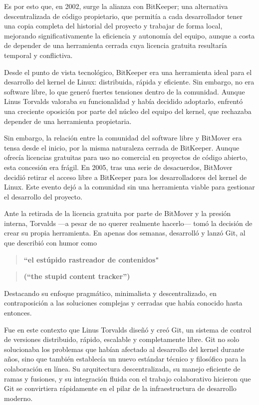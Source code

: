 \documentclass[a4paper,12pt]{article}
\begin{document}
Es por esto que, en 2002, surge la alianza con BitKeeper; una alternativa
descentralizada de código propietario, que permitía a cada desarrollador
tener una copia completa del historial del proyecto y trabajar de forma local,
mejorando significativamente la eficiencia y autonomía del equipo, aunque a
costa de depender de una herramienta cerrada cuya licencia gratuita resultaría
temporal y conflictiva.

Desde el punto de vista tecnológico, BitKeeper era una herramienta ideal para el
desarrollo del kernel de Linux: distribuida, rápida y eficiente. Sin embargo, no
era software libre, lo que generó fuertes tensiones dentro de la comunidad.
Aunque Linus Torvalds valoraba su funcionalidad y había decidido adoptarlo,
enfrentó una creciente oposición por parte del núcleo del equipo del kernel, que
rechazaba depender de una herramienta propietaria.

Sin embargo, la relación entre la comunidad del software libre y BitMover era
tensa desde el inicio, por la misma naturaleza cerrada de BitKeeper. Aunque
ofrecía licencias gratuitas para uso no comercial en proyectos de código
abierto, esta concesión era frágil. En 2005, tras una serie de desacuerdos,
BitMover decidió retirar el acceso libre a BitKeeper para los desarrolladores
del kernel de Linux. Este evento dejó a la comunidad sin una herramienta viable
para gestionar el desarrollo del proyecto.

Ante la retirada de la licencia gratuita por parte de BitMover y la presión
interna, Torvalds —a pesar de no querer realmente hacerlo— tomó la decisión de
crear su propia herramienta. En apenas dos semanas, desarrolló y lanzó Git, al
que describió con humor como 
\begin{quote}
\textbf{``el estúpido rastreador de contenidos"}
\end{quote}
\begin{quote}
\textbf{(“the stupid content tracker”)}
\end{quote}

Destacando su enfoque pragmático, minimalista y
descentralizado, en contraposición a las soluciones complejas y cerradas que
había conocido hasta entonces.

Fue en este contexto que Linus Torvalds diseñó y creó Git, un sistema de control
de versiones distribuido, rápido, escalable y completamente libre. Git no solo
solucionaba los problemas que habían afectado al desarrollo del kernel durante
años, sino que también establecía un nuevo estándar técnico y filosófico para la
colaboración en línea. Su arquitectura descentralizada, su manejo eficiente de
ramas y fusiones, y su integración fluida con el trabajo colaborativo hicieron
que Git se convirtiera rápidamente en el pilar de la infraestructura de
desarrollo moderno.
\end{document}
